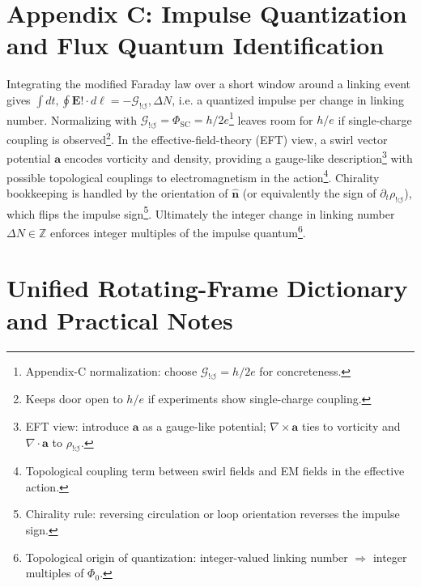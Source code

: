 \documentclass[12pt]{article}
\begin{document}



\section*{Appendix C: Impulse Quantization and Flux Quantum Identification}\label{app:Impulse}

Integrating the modified Faraday law over a short window around a linking event gives $\int dt,\oint \mathbf E!\cdot d\boldsymbol\ell = -\mathcal G_{!\circlearrowleft},\Delta N$, i.e. a quantized impulse per change in linking number. Normalizing with $\mathcal G_{!\circlearrowleft}=\Phi_\text{SC}=h/2e$\footnote{Appendix-C normalization: choose $\mathcal G_{!\circlearrowleft}=h/2e$ for concreteness.} leaves room for $h/e$ if single-charge coupling is observed\footnote{Keeps door open to $h/e$ if experiments show single-charge coupling.}. In the effective-field-theory (EFT) view, a swirl vector potential $\mathbf a$ encodes vorticity and density, providing a gauge-like description\footnote{EFT view: introduce $\mathbf a$ as a gauge-like potential; $\nabla\times\mathbf a$ ties to vorticity and $\nabla\cdot\mathbf a$ to $\rho_{!\circlearrowleft}$.} with possible topological couplings to electromagnetism in the action\footnote{Topological coupling term between swirl fields and EM fields in the effective action.}. Chirality bookkeeping is handled by the orientation of $\hat{\mathbf n}$ (or equivalently the sign of $\partial_t\rho_{!\circlearrowleft}$), which flips the impulse sign\footnote{Chirality rule: reversing circulation or loop orientation reverses the impulse sign.}. Ultimately the integer change in linking number $\Delta N\in\mathbb Z$ enforces integer multiples of the impulse quantum\footnote{Topological origin of quantization: integer-valued linking number $\Rightarrow$ integer multiples of $\Phi_0$.}.




\bigskip

\section{Unified Rotating-Frame Dictionary and Practical Notes}\label{sec:practical-notes}
\end{document}
